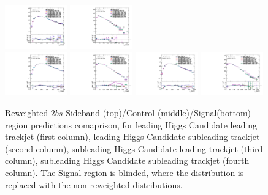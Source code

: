 \begin{figure}[htbp!]
\begin{center}
\includegraphics[width=0.24\textwidth,angle=-90]{figures/boosted/AppendixReweight/Compare/Data_TwoTag_split_Control_directcompare_sublHCand_trk0_Pt_1.pdf}
\includegraphics[width=0.24\textwidth,angle=-90]{figures/boosted/AppendixReweight/Compare/Data_TwoTag_split_Control_directcompare_sublHCand_trk1_Pt_1.pdf}\\
\includegraphics[width=0.24\textwidth,angle=-90]{figures/boosted/AppendixReweight/Compare/Data_TwoTag_split_Signal_directcompare_leadHCand_trk0_Pt_1.pdf}
\includegraphics[width=0.24\textwidth,angle=-90]{figures/boosted/AppendixReweight/Compare/Data_TwoTag_split_Signal_directcompare_leadHCand_trk1_Pt_1.pdf}
\includegraphics[width=0.24\textwidth,angle=-90]{figures/boosted/AppendixReweight/Compare/Data_TwoTag_split_Signal_directcompare_sublHCand_trk0_Pt_1.pdf}
\includegraphics[width=0.24\textwidth,angle=-90]{figures/boosted/AppendixReweight/Compare/Data_TwoTag_split_Signal_directcompare_sublHCand_trk1_Pt_1.pdf}\\
\caption{Reweighted $2bs$ Sideband (top)/Control (middle)/Signal(bottom) region predictions comaprison, for leading Higgs Candidate leading trackjet \pt (first column),  leading Higgs Candidate subleading trackjet \pt (second column), subleading Higgs Candidate leading trackjet \pt (third column), subleading Higgs Candidate subleading trackjet \pt (fourth column). The Signal region is blinded, where the distribution is replaced with the non-reweighted distributions.}
\label{fig:app-rw-comp-2bs-trkjet}
\end{center}
\end{figure}

